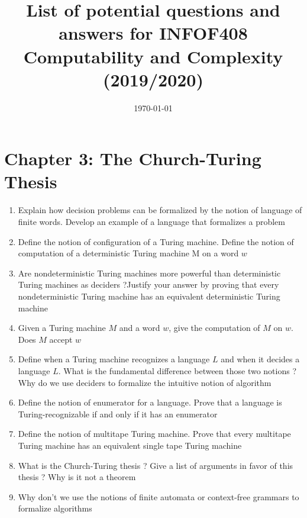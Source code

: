 \documentclass{article}
\title{List of potential questions and answers for INFOF408 Computability and Complexity (2019/2020)}
\date{\today}
\begin{document}
\maketitle
\tableofcontents
\clearpage

\section{Chapter 3: The Church-Turing Thesis}

\begin{enumerate}

\item Explain how decision problems can be formalized by the notion of language of finite words. Develop an example of a language that formalizes a problem

\item Define the notion of configuration of a Turing machine. Define the notion of computation of a deterministic Turing machine M on a word $w$

\item Are nondeterministic Turing machines more powerful than deterministic Turing machines as deciders ?Justify your answer by proving that every nondeterministic Turing machine has an equivalent deterministic Turing machine

\item Given a Turing machine $M$ and a word $w$, give the computation of $M$ on $w$. Does $M$ accept $w$ 

\item Define when a Turing machine recognizes a language $L$ and when it decides a language $L$. What is the fundamental difference between those two notions ? Why do we use deciders to formalize the intuitive notion of algorithm 

\item Define the notion of enumerator for a language. Prove that a language is Turing-recognizable if and only if it has an enumerator

\item Define the notion of multitape Turing machine. Prove that every multitape Turing machine has an equivalent single tape Turing machine

\item What is the Church-Turing thesis ? Give a list of arguments in favor of this thesis ? Why is it not a theorem 

\item Why don’t we use the notions of finite automata or context-free grammars to formalize algorithms 
\end{enumerate}
\end{document}
